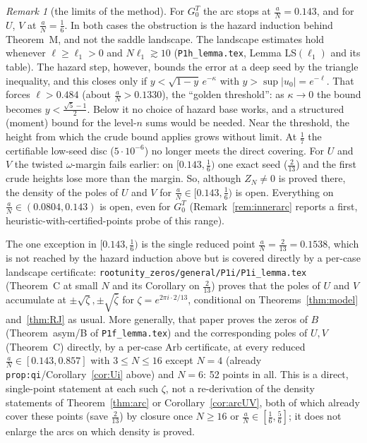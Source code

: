 \documentclass[11pt]{article}
\theoremstyle{plain}
\theoremstyle{definition}
\theoremstyle{remark}
\newtheorem{remark}[theorem]{Remark}
\theoremstyle{plain}\newtheorem*{maintheorem}{Main Theorem}
\begin{document}
\begin{remark}[the limits of the method]\label{rem:arcobstruction}
For $G^T_0$ the arc stops at $\frac aN=0.143$, and for $U$, $V$ at $\frac aN=\frac16$. In both cases the obstruction is the
hazard induction behind Theorem~M, and not the saddle landscape. The landscape estimates hold whenever
$\ell\ge\ell_1>0$ and $N\ell_1\gtrsim10$ (\texttt{P1h\_lemma.tex}, Lemma LS$(\ell_1)$ and its table). The hazard step, however,
bounds the error at a deep seed by the triangle inequality, and this closes only if $y<\sqrt{1-y}\,e^{-\kappa}$ with
$y>\sup|u_0|=e^{-\ell}$. That forces $\ell>0.484$ (about $\frac aN>0.1330$), the ``golden threshold'': as $\kappa\to0$ the
bound becomes $y<\frac{\sqrt5-1}2$. Below it no choice of hazard base works, and a structured (moment) bound for the
level-$n$ sums would be needed. Near the threshold, the height from which the crude bound applies grows without
limit. At $\frac17$ the certifiable low-seed disc ($5\cdot10^{-6}$) no longer meets the direct covering. For $U$ and $V$
the twisted $\omega$-margin fails earlier: on $[0.143,\frac16)$ one exact seed ($\frac2{13}$) and the first crude
heights lose more than the margin. So, although $Z_N\ne0$ is proved there, the density of the poles of $U$ and $V$
for $\frac aN\in[0.143,\frac16)$ is open. Everything on $\frac aN\in(0.0804,0.143)$ is open, even for $G^T_0$
(Remark~\ref{rem:innerarc} reports a first, heuristic-with-certified-points probe of this range).

The one exception in $[0.143,\frac16)$ is the single reduced point $\frac aN=\frac2{13}=0.1538$, which is
not reached by the hazard induction above but is covered directly by a per-case landscape certificate:
\texttt{rootunity\_zeros/general/P1i/P1i\_lemma.tex} (Theorem~C at small $N$ and its Corollary on
$\frac2{13}$) proves that the poles of $U$ and $V$ accumulate at $\pm\sqrt\zeta,\pm\sqrt{\bar\zeta}$ for
$\zeta=e^{2\pi i\cdot2/13}$, conditional on Theorems~\ref{thm:model} and~\ref{thm:RJ} as usual. More
generally, that paper proves the zeros of $B$ (Theorem~asym/B of \texttt{P1f\_lemma.tex}) and the
corresponding poles of $U,V$ (Theorem~C) directly, by a per-case Arb certificate, at every reduced
$\frac aN\in[0.143,0.857]$ with $3\le N\le16$ except $N=4$ (already \texttt{prop:qi}/Corollary~\ref{cor:Ui}
above) and $N=6$: 52 points in all. This is a direct, single-point statement at each such $\zeta$, not a
re-derivation of the density statements of Theorem~\ref{thm:arc} or Corollary~\ref{cor:arcUV}, both of
which already cover these points (save $\frac2{13}$) by closure once $N\ge16$ or $\frac aN\in[\frac16,\frac56]$;
it does not enlarge the arcs on which density is proved.


\end{remark}
\end{document}
